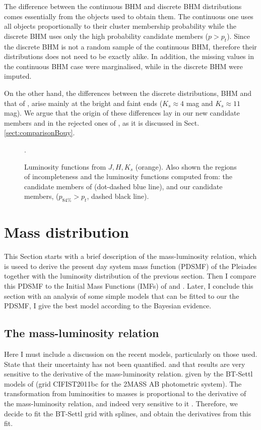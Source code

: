 The difference between the continuous BHM  and discrete BHM distributions comes essentially from the objects used to obtain them. The continuous one uses all objects proportionally to their cluster membership probability while the discrete BHM uses only the high probability candidate members ($p>p_t$). Since the discrete BHM is not a random sample of the continuous BHM, therefore their distributions does not need to be exactly alike. In addition, the missing values in the continuous BHM case were marginalised, while in the discrete BHM were imputed.
 
On the other hand, the differences between the discrete distributions, BHM and that of \citet{Bouy2015}, arise mainly at the bright and faint ends ($K_s\approx 4$ mag and $K_s\approx11$ mag). We argue that the origin of these differences lay in our new candidate members and in the rejected ones of \citet{Bouy2015}, as it is discussed in Sect. \ref{sect:comparisonBouy}.

\begin{figure}[htbp]
\begin{center}
\caption{Luminosity functions from $J,H,K_s$ (orange). Also shown the regions of incompleteness and the luminosity functions computed from: the candidate members of \citet{Bouy2015} (dot-dashed blue line), and our candidate members, ($p_{84\%}>p_t$, dashed black line).}
\label{figure:Luminosities}.
\end{center}
\end{figure}

\section{Mass distribution}
This Section starts with a brief description of the mass-luminosity relation, which is useed to derive the present day system mass function (PDSMF) of the Pleiades together with the luminosity distribution of the previous section. Then I compare this PDSMF to the Initial Mass Functions (IMFs) of \citet{Chabrier2005} and \citet{Thies2007}. Later, I conclude this section with an analysis of some simple models that can be fitted to our the PDSMF, I give the best model according to the Bayesian evidence.

\subsection{The mass-luminosity relation}
Here I must include a discussion on the recent models, particularly on those used. State that their uncertainty has not been quantified. and that results are very sensitive to the derivative of the mass-luminosity relation.  given by the BT-Settl models of \citet{Allard2012} (grid CIFIST2011bc for the 2MASS AB photometric system). The transformation from luminosities to masses is proportional to the derivative of the mass-luminosity relation, and indeed very sensitive to it \cite[see][ for some words of caution]{DAntona1998}. Therefore, we decide to fit the BT-Settl grid with splines, and obtain the derivatives from this fit. 

